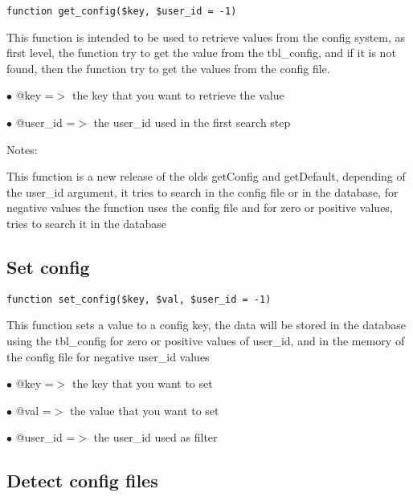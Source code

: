 \documentclass[a4paper]{book}
\begin{document}
\begin{lstlisting}
function get_config($key, $user_id = -1)
\end{lstlisting}

This function is intended to be used to retrieve values from the
config system, as first level, the function try to get the value from
the tbl\_config, and if it is not found, then the function try to get
the values from the config file.

\begin{compactitem}
\item[\color{myblue}$\bullet$] @key     =$>$ the key that you want to retrieve the value
\item[\color{myblue}$\bullet$] @user\_id =$>$ the user\_id used in the first search step
\end{compactitem}

Notes:

This function is a new release of the olds getConfig and getDefault,
depending of the user\_id argument, it tries to search in the config
file or in the database, for negative values the function uses the
config file and for zero or positive values, tries to search it in
the database

\hypertarget{toc56}{}
\subsection{Set config}

\begin{lstlisting}
function set_config($key, $val, $user_id = -1)
\end{lstlisting}

This function sets a value to a config key, the data will be stored in the
database using the tbl\_config for zero or positive values of user\_id, and
in the memory of the config file for negative user\_id values

\begin{compactitem}
\item[\color{myblue}$\bullet$] @key     =$>$ the key that you want to set
\item[\color{myblue}$\bullet$] @val     =$>$ the value that you want to set
\item[\color{myblue}$\bullet$] @user\_id =$>$ the user\_id used as filter
\end{compactitem}

\hypertarget{toc57}{}
\subsection{Detect config files}
\end{document}
